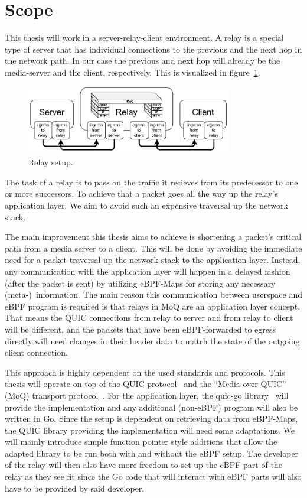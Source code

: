 \section{Scope}\label{sec:scope}

This thesis will work in a server-relay-client environment.
A relay is a special type of server that has individual 
connections to the previous and the next hop in the network path.
In our case the previous and next hop will already be the media-server and 
the client, respectively.
This is visualized in figure~\ref{fig:relay-setup}.
\vspace{0.5cm}
\begin{figure}[H]
    \centering
    \includegraphics[width=0.8\textwidth]{figures/02_background/general-relay.drawio.pdf}
    \caption[Server-Relay-Client-Setup]{Relay setup.}\label{fig:relay-setup}
\end{figure}
The task of a relay is to pass on the traffic it recieves from its predecessor
to one or more successors.
To achieve that a packet goes all the way up the relay's application layer.
We aim to avoid such an expensive traversal up the network stack.

The main improvement this thesis aims to achieve is shortening a packet's critical path from a media server to a client.
This will be done by avoiding the immediate need for a packet traversal up the network stack to the application layer.
Instead, any communication with the application layer will happen in a delayed fashion (after the packet is sent) by utilizing 
eBPF-Maps for storing any necessary (meta-)~information.
The main reason this communication between userspace and eBPF program is required is that relays in MoQ are an application layer concept.
That means the QUIC connections from relay to server and from relay to client will be different, and the packets that have been eBPF-forwarded to egress directly will need changes in their header data to match the state of the outgoing client connection.  

This approach is highly dependent on the used standards and protocols.
This thesis will operate on top of the QUIC protocol~\parencite{rfc-9000} and the ``Media over QUIC'' (MoQ) 
transport protocol~\parencite{draft-moqtransport}.
For the application layer, the quic-go library~\parencite{quic-go-repo} will provide the implementation and 
any additional (non-eBPF) program will also be written in Go.
Since the setup is dependent on retrieving data from eBPF-Maps, the QUIC library providing the implementation 
will need some adaptations.
We will mainly introduce simple function pointer style additions that allow the adapted library to be run 
both with and without the eBPF setup.
The developer of the relay will then also have more freedom to set up the eBPF part of the relay as they see fit
since the Go code that will interact with eBPF parts will also have to be provided by said developer.

